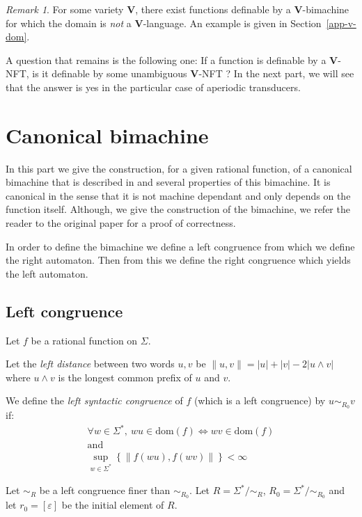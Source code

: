 \documentclass[12pt]{report}
\theoremstyle{definition}
\theoremstyle{remark}
\newtheorem{rmk}{Remark}[section]
\begin{document}
\begin{rmk}
For some variety \textbf V, there exist functions definable by a \textbf V-bimachine for which the domain is \emph{not} a \textbf V-language.
An example is given in Section~\ref{app-v-dom}.

A question that remains is the following one:
If a function is definable by a \textbf V-NFT, is it definable by some unambiguous \textbf V-NFT ?
In the next part, we will see that the answer is yes in the particular case of aperiodic transducers.
\end{rmk}

\section{Canonical bimachine}

In this part we give the construction, for a given rational function, of a canonical bimachine that is described in \cite{reutenauers91} and several properties of this bimachine. It is canonical in the sense that it is not machine dependant and only depends on the function itself.
Although, we give the construction of the bimachine, we refer the reader to the original paper for a proof of correctness.

In order to define the bimachine we define a left congruence from which we define the right automaton. Then from this we define the right congruence which yields the left automaton.

\subsection{Left congruence}
Let $f$ be a rational function  on $\Sigma$.


Let the \emph{left distance} between two words $u,v$ be $\lVert u,v \rVert=|u|+|v|-2|u\wedge v|$ where $u\wedge v$ is the longest common prefix of $u$ and $v$.

We define the \emph{left syntactic congruence} of $f$ (which is a left congruence) by $ u\sim_{R_0} v$ if:
$$\begin{array}{c}
\forall w\in \Sigma^\ast,\  wu\in \mathrm{dom}(f) \Leftrightarrow wv\in \mathrm{dom}(f)\\
\text{and}\\
\sup_{w\in \Sigma^\ast}\left\{\lVert f(wu),f(wv)\rVert \right\}<\infty
\end{array}$$


Let $\sim_R $ be a left congruence finer than $\sim_{R_0}$. Let $R=\Sigma^\ast / \sim_R$, $R_0=\Sigma^\ast / \sim_{R_0}$ and let $r_0=[\varepsilon]$ be the initial element of $R$.
\end{document}
